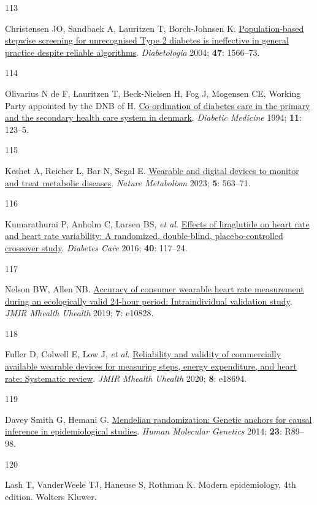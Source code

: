 \documentclass[
  a4paper,
  headsepline=true,
  open=any]{scrbook}
\newlength{\cslhangindent}
\newlength{\csllabelwidth}
\newlength{\cslentryspacingunit} %
\newenvironment{CSLReferences}[2] %
 {%
  \setlength{\parindent}{0pt}
  \ifodd #1
  \let\oldpar\par
  \def\par{\hangindent=\cslhangindent\oldpar}
  \fi
  \setlength{\parskip}{#2\cslentryspacingunit}
 }%
 {}
\newcommand{\CSLLeftMargin}[1]{\parbox[t]{\csllabelwidth}{#1}}
\newcommand{\CSLRightInline}[1]{\parbox[t]{\linewidth - \csllabelwidth}{#1}\break}
\begin{document}
\begin{CSLReferences}{0}{0}
\leavevmode{}%
\CSLLeftMargin{113 }%
\CSLRightInline{Christensen JO, Sandbaek A, Lauritzen T, Borch-Johnsen
K. \href{https://doi.org/10.1007/s00125-004-1496-2}{Population-based
stepwise screening for unrecognised Type 2 diabetes is ineffective in
general practice despite reliable algorithms}. \emph{Diabetologia} 2004;
\textbf{47}: 1566--73.}

\leavevmode{}%
\CSLLeftMargin{114 }%
\CSLRightInline{Olivarius N de F, Lauritzen T, Beck-Nielsen H, Fog J,
Mogensen CE, Working Party appointed by the DNB of H.
\href{https://doi.org/10.1111/j.1464-5491.1994.tb00243.x}{Co-ordination
of diabetes care in the primary and the secondary health care system in
denmark}. \emph{Diabetic Medicine} 1994; \textbf{11}: 123--5.}

\leavevmode{}%
\CSLLeftMargin{115 }%
\CSLRightInline{Keshet A, Reicher L, Bar N, Segal E.
\href{https://doi.org/10.1038/s42255-023-00778-y}{Wearable and digital
devices to monitor and treat metabolic diseases}. \emph{Nature
Metabolism} 2023; \textbf{5}: 563--71.}

\leavevmode{}%
\CSLLeftMargin{116 }%
\CSLRightInline{Kumarathurai P, Anholm C, Larsen BS, \emph{et al.}
\href{https://doi.org/10.2337/dc16-1580}{Effects of liraglutide on heart
rate and heart rate variability: A randomized, double-blind,
placebo-controlled crossover study}. \emph{Diabetes Care} 2016;
\textbf{40}: 117--24.}

\leavevmode{}%
\CSLLeftMargin{117 }%
\CSLRightInline{Nelson BW, Allen NB.
\href{https://doi.org/10.2196/10828}{Accuracy of consumer wearable heart
rate measurement during an ecologically valid 24-hour period:
Intraindividual validation study}. \emph{JMIR Mhealth Uhealth} 2019;
\textbf{7}: e10828.}

\leavevmode{}%
\CSLLeftMargin{118 }%
\CSLRightInline{Fuller D, Colwell E, Low J, \emph{et al.}
\href{https://doi.org/10.2196/18694}{Reliability and validity of
commercially available wearable devices for measuring steps, energy
expenditure, and heart rate: Systematic review}. \emph{JMIR Mhealth
Uhealth} 2020; \textbf{8}: e18694.}

\leavevmode{}%
\CSLLeftMargin{119 }%
\CSLRightInline{Davey Smith G, Hemani G.
\href{https://doi.org/10.1093/hmg/ddu328}{Mendelian randomization:
Genetic anchors for causal inference in epidemiological studies}.
\emph{Human Molecular Genetics} 2014; \textbf{23}: R89--98.}

\leavevmode{}%
\CSLLeftMargin{120 }%
\CSLRightInline{Lash T, VanderWeele TJ, Haneuse S, Rothman K. Modern
epidemiology, 4th edition. Wolters Kluwer.}

\end{CSLReferences}
\end{document}
